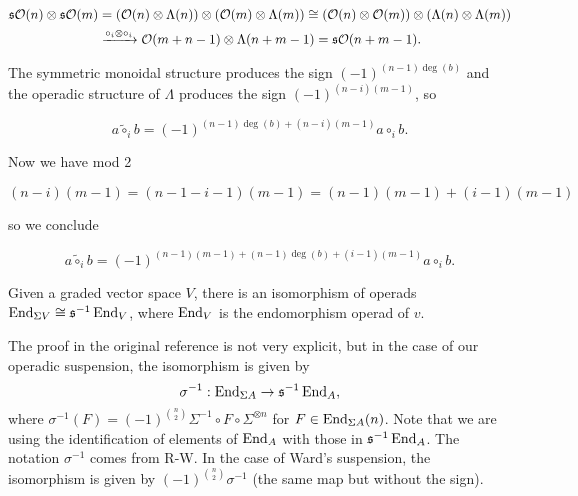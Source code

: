 \documentclass[twoside]{article}
\begin{document}
\begin{align*}
\mathfrak{s}{\mathcal O}(n)\otimes\mathfrak{s}{\mathcal O}(m)&=({\mathcal O}(n)\otimes\Lambda(n))\otimes ({\mathcal O}(m)\otimes\Lambda(m))\cong ({\mathcal O}(n)\otimes {\mathcal O}(m))\otimes (\Lambda(n)\otimes \Lambda(m))\\
&\xrightarrow{\circ_i\otimes\circ_i} {\mathcal O}(m+n-1)\otimes \Lambda(n+m-1)=\mathfrak{s}{\mathcal O}(n+m-1).
\end{align*}

The symmetric monoidal structure produces the sign $(-1)^{(n-1)\deg(b)}$ and the operadic structure of $\Lambda$ produces the sign $(-1)^{(n-i)(m-1)}$, so 

$$a\tilde{\circ}_ib=(-1)^{(n-1)\deg(b)+(n-i)(m-1)}a\circ_i b.$$

Now we have mod 2

$$(n-i)(m-1)=(n-1-i-1)(m-1)=(n-1)(m-1)+(i-1)(m-1)$$

so we conclude 

$$a\tilde{\circ}_ib=(-1)^{(n-1)(m-1)+(n-1)\deg(b)+(i-1)(m-1)}a\circ_i b.$$


%

\begin{theorem}
Given a graded vector space $V$, there is an isomorphism of operads $\operatorname{End}_{\Sigma V}\cong \mathfrak{s}^{-1}\operatorname{End}_V$, where $\operatorname{End}_V$ is the endomorphism operad of $v$.
\end{theorem}
The proof in the original reference is not very explicit, but in the case of our operadic suspension, the isomorphism is given by $$\sigma^{-1}:\operatorname{End}_{\Sigma A}\to\mathfrak{s}^{-1}\operatorname{End}_A,$$ where $\sigma^{-1}(F)=(-1)^{\binom{n}{2}}\Sigma^{-1}\circ F\circ \Sigma^{\otimes n}$ for $F\in \operatorname{End}_{\Sigma A}(n)$. %
Note that we are using the identification of elements of $\operatorname{End}_A$ with those in $\mathfrak{s}^{-1}\operatorname{End}_A$. The notation $\sigma^{-1}$ comes from R-W. In the case of Ward's suspension, the isomorphism is given by $(-1)^{\binom{n}{2}}\sigma^{-1}$ (the same map but without the sign).
\end{document}
